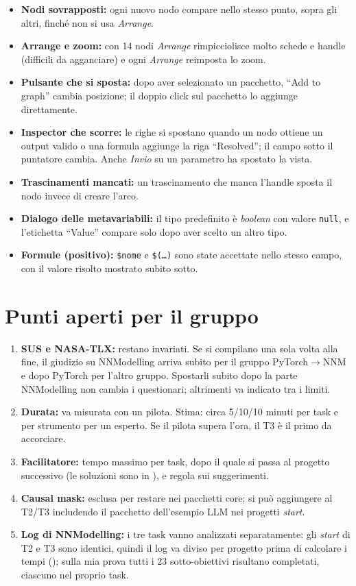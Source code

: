 \documentclass[10pt,a4paper]{article}
\newcommand{\file}[1]{\texttt{\small\detokenize{#1}}}
\begin{document}
\begin{itemize}
    \item \textbf{Nodi sovrapposti:} ogni nuovo nodo compare nello stesso punto, sopra gli
    altri, finché non si usa \emph{Arrange}.
    \item \textbf{Arrange e zoom:} con 14 nodi \emph{Arrange} rimpicciolisce molto schede e
    handle (difficili da agganciare) e ogni \emph{Arrange} reimposta lo zoom.
    \item \textbf{Pulsante che si sposta:} dopo aver selezionato un pacchetto, ``Add to graph''
    cambia posizione; il doppio click sul pacchetto lo aggiunge direttamente.
    \item \textbf{Inspector che scorre:} le righe si spostano quando un nodo ottiene un output
    valido o una formula aggiunge la riga ``Resolved''; il campo sotto il puntatore cambia.
    Anche \emph{Invio} su un parametro ha spostato la vista.
    \item \textbf{Trascinamenti mancati:} un trascinamento che manca l'handle sposta il nodo
    invece di creare l'arco.
    \item \textbf{Dialogo delle metavariabili:} il tipo predefinito è \emph{boolean} con valore
    \texttt{null}, e l'etichetta ``Value'' compare solo dopo aver scelto un altro tipo.
    \item \textbf{Formule (positivo):} \texttt{\$nome} e \texttt{\$(\ldots)} sono state accettate
    nello stesso campo, con il valore risolto mostrato subito sotto.
\end{itemize}

\section{Punti aperti per il gruppo}

\begin{enumerate}
    \item \textbf{SUS e NASA-TLX:} restano invariati. Se si compilano una sola volta alla
    fine, il giudizio su NNModelling arriva subito per il gruppo PyTorch\(\to\)NNM e dopo
    PyTorch per l'altro gruppo. Spostarli subito dopo la parte NNModelling non cambia i
    questionari; altrimenti va indicato tra i limiti.
    \item \textbf{Durata:} va misurata con un pilota. Stima: circa 5/10/10 minuti per task e
    per strumento per un esperto. Se il pilota supera l'ora, il T3 è il primo da accorciare.
    \item \textbf{Facilitatore:} tempo massimo per task, dopo il quale si passa al progetto
    successivo (le soluzioni sono in \file{facilitator/}), e regola sui suggerimenti.
    \item \textbf{Causal mask:} esclusa per restare nei pacchetti core; si può aggiungere al
    T2/T3 includendo il pacchetto dell'esempio LLM nei progetti \emph{start}.
    \item \textbf{Log di NNModelling:} i tre task vanno analizzati separatamente: gli \emph{start}
    di T2 e T3 sono identici, quindi il log va diviso per progetto prima di calcolare i tempi
    (\file{analyse_activity.py}); sulla mia prova tutti i 23 sotto-obiettivi risultano completati, ciascuno nel proprio task.
\end{enumerate}
\end{document}
